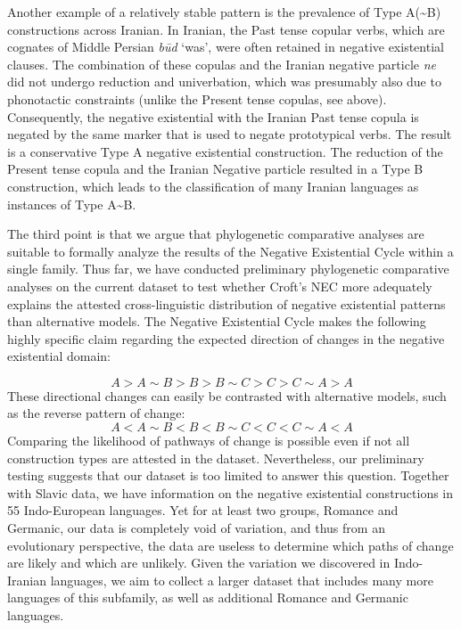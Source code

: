 \documentclass[output=paper,colorlinks,citecolor=brown]{langscibook}
\begin{document}
Another example of a relatively stable pattern is the prevalence of Type
A({\textasciitilde}B) constructions across Iranian. In Iranian, the Past
tense copular verbs, which are cognates of Middle Persian \textit{būd}
`was', were often retained in negative existential clauses. The combination
of these copulas and the Iranian negative particle \textit{ne} did not
undergo reduction and univerbation, which was presumably also due to
phonotactic constraints (unlike the Present tense copulas, see
 above). Consequently, the negative existential with the Iranian Past tense copula is negated by the same marker that is used to negate prototypical verbs. The result is a conservative Type A negative existential construction. The reduction of the Present tense copula and the Iranian Negative particle resulted in a Type B construction, which leads to the classification of many Iranian languages as instances of Type A{\textasciitilde}B. 

  The third point is that we argue that phylogenetic comparative analyses are suitable to formally analyze the results of the Negative Existential Cycle within a single family. Thus far, we have conducted preliminary phylogenetic comparative analyses on the current dataset to test whether Croft's NEC more adequately explains the attested cross-linguistic distribution of negative existential patterns than alternative models. The Negative Existential Cycle makes the following highly specific claim regarding the expected direction of changes in the negative existential domain: 

\begin{equation*}  
A > A{\sim}B > B > B{\sim}C > C > C{\sim}A > A
\end{equation*}
%
These directional changes can easily be contrasted with alternative models, such as the reverse pattern of change:
%
\begin{equation*}  
A < A{\sim}B < B < B{\sim}C < C < C{\sim}A < A
\end{equation*}
%
Comparing the likelihood of pathways of change is possible even if not all construction types are attested in the dataset. Nevertheless, our preliminary testing suggests that our dataset is too limited to answer this question. Together with  Slavic data, we have information on the negative existential constructions in 55 Indo-European languages. Yet for at least two groups, Romance and Germanic, our data is completely void of variation, and thus from an evolutionary perspective, the data are useless to determine which paths of change are likely and which are unlikely. Given the variation we discovered in Indo-Iranian languages, we aim to collect a larger dataset that includes many more languages of this subfamily, as well as additional Romance and Germanic languages. 
\end{document}
